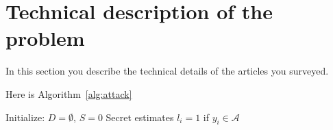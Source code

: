 \section{Technical description of the problem}

In this section you describe the technical details of the articles you surveyed.

Here is Algorithm~\ref{alg:attack}
\begin{algorithm}[t]
	\caption{Attack Algorithm}
	\label{alg:attack} 	
	\DontPrintSemicolon
	\medskip

	\medskip

	Initialize: $D = \emptyset $, $S = 0$ \;
	Secret estimates $l_i = 1$ if $y_i  \in \mathcal{A}$
\end{algorithm}